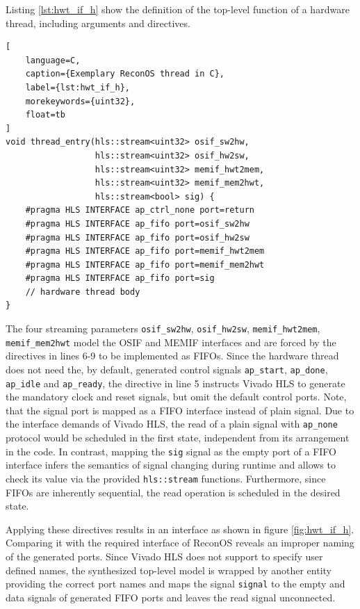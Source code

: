 Listing \ref{lst:hwt_if_h} show the definition of the top-level function of a
hardware thread, including arguments and directives.
\begin{lstlisting}[
	language=C,
	caption={Exemplary ReconOS thread in C},
	label={lst:hwt_if_h},
	morekeywords={uint32},
	float=tb
]
void thread_entry(hls::stream<uint32> osif_sw2hw,
                  hls::stream<uint32> osif_hw2sw,
                  hls::stream<uint32> memif_hwt2mem,
                  hls::stream<uint32> memif_mem2hwt,
                  hls::stream<bool> sig) {
	#pragma HLS INTERFACE ap_ctrl_none port=return
	#pragma HLS INTERFACE ap_fifo port=osif_sw2hw
	#pragma HLS INTERFACE ap_fifo port=osif_hw2sw
	#pragma HLS INTERFACE ap_fifo port=memif_hwt2mem
	#pragma HLS INTERFACE ap_fifo port=memif_mem2hwt
	#pragma HLS INTERFACE ap_fifo port=sig
	// hardware thread body
}
\end{lstlisting}
The four streaming parameters \lstinline{osif_sw2hw}, \lstinline{osif_hw2sw},
\lstinline{memif_hwt2mem}, \lstinline{memif_mem2hwt} model the \ac{OSIF} and
\ac{MEMIF} interfaces and are forced by the directives in lines 6-9 to be
implemented as \acp{FIFO}. Since the hardware thread does not need the, by
default, generated control signals \lstinline{ap_start}, \lstinline{ap_done},
\lstinline{ap_idle} and \lstinline{ap_ready}, the directive in line 5
instructs Vivado HLS to generate the mandatory clock and reset signals, but
omit the default control ports. Note, that the signal port is mapped as a
\ac{FIFO} interface instead of plain signal. Due to the interface demands of
Vivado HLS, the read of a plain signal with \lstinline{ap_none} protocol would
be scheduled in the first state, independent from its arrangement in the code.
In contrast, mapping the \lstinline{sig} signal as the empty port of a
\ac{FIFO} interface infers the semantics of signal changing during runtime and
allows to check its value via the provided \lstinline{hls::stream} functions.
Furthermore, since \acp{FIFO} are inherently sequential, the read operation is
scheduled in the desired state.

Applying these directives results in an interface as shown in figure
\ref{fig:hwt_if_h}. Comparing it with the required interface of ReconOS
reveals an improper naming of the generated ports. Since Vivado HLS does not
support to specify user defined names, the synthesized top-level model is
wrapped by another entity providing the correct port names and maps the signal
\lstinline{signal} to the empty and data signals of generated \ac{FIFO} ports
and leaves the read signal unconnected.

